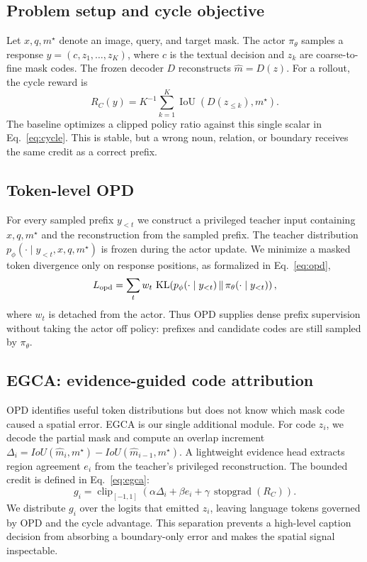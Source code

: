\documentclass{article}
\begin{document}
\subsection{Problem setup and cycle objective}Let $x,q,m^\star$ denote an image, query, and target mask. The actor $\pi_\theta$ samples a response $y=(c,z_1,\ldots,z_K)$, where $c$ is the textual decision and $z_k$ are coarse-to-fine mask codes. The frozen decoder $D$ reconstructs $\hat m=D(z)$. For a rollout, the cycle reward is
\begin{equation}\label{eq:cycle}R_C(y)=K^{-1}\sum_{k=1}^{K}\operatorname{IoU}(D(z_{\leq k}),m^\star).\end{equation}
The baseline optimizes a clipped policy ratio against this single scalar in Eq.~\ref{eq:cycle}. This is stable, but a wrong noun, relation, or boundary receives the same credit as a correct prefix.
\subsection{Token-level OPD}For every sampled prefix $y_{<t}$ we construct a privileged teacher input containing $x,q,m^\star$ and the reconstruction from the sampled prefix. The teacher distribution $p_\phi(\cdot\mid y_{<t},x,q,m^\star)$ is frozen during the actor update. We minimize a masked token divergence only on response positions, as formalized in Eq.~\ref{eq:opd},
\begin{equation}\label{eq:opd}L_{\rm opd}=\sum_t w_t\,\operatorname{KL}\!\left(p_\phi(\cdot\mid y_{<t})\,\|\,\pi_\theta(\cdot\mid y_{<t})\right),
\end{equation}
where $w_t$ is detached from the actor. Thus OPD supplies dense prefix supervision without taking the actor off policy: prefixes and candidate codes are still sampled by $\pi_\theta$.
\subsection{EGCA: evidence-guided code attribution}OPD identifies useful token distributions but does not know which mask code caused a spatial error. EGCA is our single additional module. For code $z_i$, we decode the partial mask and compute an overlap increment $\Delta_i=IoU(\hat m_i,m^\star)-IoU(\hat m_{i-1},m^\star)$. A lightweight evidence head extracts region agreement $e_i$ from the teacher's privileged reconstruction. The bounded credit is defined in Eq.~\ref{eq:egca}:
\begin{equation}\label{eq:egca}g_i=\operatorname{clip}_{[-1,1]}(\alpha\Delta_i+\beta e_i+\gamma\,\operatorname{stopgrad}(R_C)).
\end{equation}
We distribute $g_i$ over the logits that emitted $z_i$, leaving language tokens governed by OPD and the cycle advantage. This separation prevents a high-level caption decision from absorbing a boundary-only error and makes the spatial signal inspectable.
\end{document}
